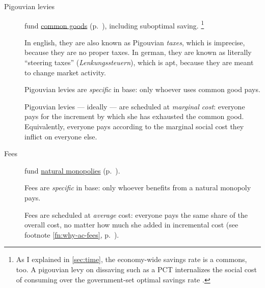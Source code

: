 \begin{description}
	\item[Pigouvian levies]
	\label{sec:levies}
	fund \hyperref[sec:common-good]{common goods} (p.~\pageref{sec:common-good}), including suboptimal saving.
	\footnote{
		As I explained in \autoref{sec:time}, the economy-wide savings rate is a commons, too.
		A pigouvian levy on dissaving such as a \gls{PCT} internalizes the social cost of consuming over the government-set optimal savings rate \citep{Held2010a}.
	}

	In english, they are also known as Pigouvian \emph{taxes}, which is imprecise, because they are no proper taxes.
	In german, they are known as literally ``steering taxes'' (\emph{Lenkungssteuern}), which is apt, because they are meant to change market activity.

	Pigouvian levies are \emph{specific} in base:
	only whoever uses common good pays.

	Pigouvian levies --- ideally --- are scheduled at \emph{marginal cost}:
	everyone pays for the increment by which she has exhausted the common good.
	Equivalently, everyone pays according to the marginal social cost they inflict on everyone else.




	\item[Fees]
		\label{sec:fees}
	fund \hyperref[sec:natural-monopoly]{natural monopolies} (p.~\pageref{sec:natural-monopoly}).

	Fees are \emph{specific} in base:
	only whoever benefits from a natural monopoly pays.

	Fees are scheduled at \emph{average} cost:
	everyone pays the same share of the overall cost, no matter how much she added in incremental cost (see footnote \ref{fn:why-ac-fees}, p.~\pageref{fn:why-ac-fees}).


\end{description}
